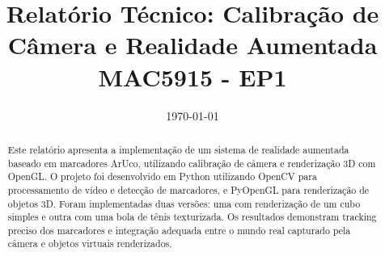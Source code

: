 \documentclass[12pt,a4paper]{article}
\title{Relatório Técnico: Calibração de Câmera e Realidade Aumentada\\MAC5915 - EP1}
\author{}
\date{\today}
\begin{document}
\maketitle

\begin{abstract}
Este relatório apresenta a implementação de um sistema de realidade aumentada baseado em marcadores ArUco, utilizando calibração de câmera e renderização 3D com OpenGL. O projeto foi desenvolvido em Python utilizando OpenCV para processamento de vídeo e detecção de marcadores, e PyOpenGL para renderização de objetos 3D. Foram implementadas duas versões: uma com renderização de um cubo simples e outra com uma bola de tênis texturizada. Os resultados demonstram tracking preciso dos marcadores e integração adequada entre o mundo real capturado pela câmera e objetos virtuais renderizados.
\end{abstract}

\tableofcontents
\newpage







\newpage

\end{document}
